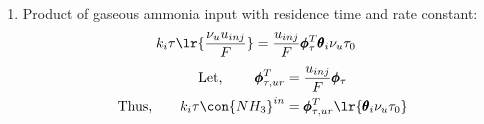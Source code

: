 \begin{enumerate}
        \item Product of gaseous ammonia input with residence time and rate constant:
        \begin{align*}
        k_{i} \tau \lr{\frac{\nu_u u_{inj}}{F}} &= \frac{u_{inj}}{F} \pmb \phi_\tau^T \pmb \theta_i \nu_u \tau_0
        \end{align*}
        \begin{align}
        \text{Let, } \qquad \pmb\phi_{\tau,ur}^T &= \frac{u_{inj}}{F}  \pmb \phi_\tau \\
        \text{Thus,} \qquad k_i \tau \con{NH_3}^{in} &= \pmb \phi_{\tau, ur}^T \lr{\pmb \theta_{i} \nu_u \tau_0}   \label{eqn::k_tau_urea}
        \end{align}


\end{enumerate}
